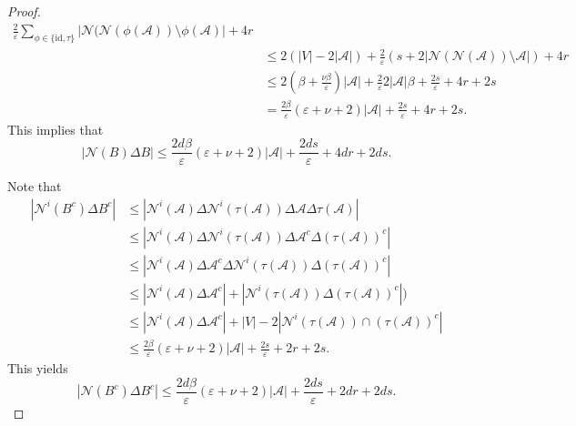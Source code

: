 \documentclass[10pt]{article}
\theoremstyle{definition}
\newcommand{\id}{\ensuremath{\mathrm{id}}}
\newcommand{\calN}{\ensuremath{\mathcal{N}}}
\newcommand{\scrA}{\ensuremath{\mathscr{A}}}
\begin{document}
\begin{proof}
\begin{align*}
\frac 2\varepsilon\sum_{\phi\in \{\id, \tau\}} |\calN(\calN(\phi(\scrA)) \setminus \phi(\scrA)| + 4r\\
& \leq 2(|V| - 2|\scrA|) + 
\frac 2\varepsilon (s+ 2 |\calN(\calN(\scrA)) \setminus \scrA| ) + 4r\\
& \leq 2\left(\beta + \frac{\nu\beta}\varepsilon \right)|\scrA| +\frac 2\varepsilon 2|\scrA|\beta + \frac {2s}\varepsilon   + 4r + 2s\\
& =  \frac{2\beta}\varepsilon (\varepsilon + \nu + 2)|\scrA| + \frac {2s}\varepsilon  + 4r + 2s.
\end{align*}
This implies that 
$$
|\calN(B) \Delta B|
\leq 
\frac{2d\beta}\varepsilon (\varepsilon + \nu + 2)|\scrA| +  \frac {2ds}\varepsilon  + 4dr + 2ds.
$$

Note that 
\begin{align*}
|\calN^i(B^c) \Delta B^c| 
& \leq |\calN^i(\scrA) \Delta \calN^i(\tau(\scrA)) \Delta \scrA \Delta\tau(\scrA)| \\
& \leq |\calN^i(\scrA) \Delta \calN^i(\tau(\scrA)) \Delta \scrA^c \Delta (\tau(\scrA))^c| \\
& \leq |\calN^i(\scrA) \Delta \scrA^c \Delta \calN^i(\tau(\scrA)) \Delta (\tau(\scrA))^c| \\
& \leq |\calN^i(\scrA) \Delta \scrA^c| + |\calN^i(\tau(\scrA)) \Delta (\tau(\scrA))^c| )\\
& \leq |\calN^i(\scrA) \Delta \scrA^c| + |V| - 2 |\calN^i(\tau(\scrA)) \cap (\tau(\scrA))^c| \\
& \leq \frac{2\beta}\varepsilon (\varepsilon + \nu + 2)|\scrA| + \frac {2s}\varepsilon  + 2r + 2s.
\end{align*}
This yields 
$$
|\calN(B^c) \Delta B^c|
\leq 
\frac{2d\beta}\varepsilon (\varepsilon + \nu + 2)|\scrA| + \frac {2ds}\varepsilon +  2dr + 2ds.
$$


\end{proof}
\end{document}
